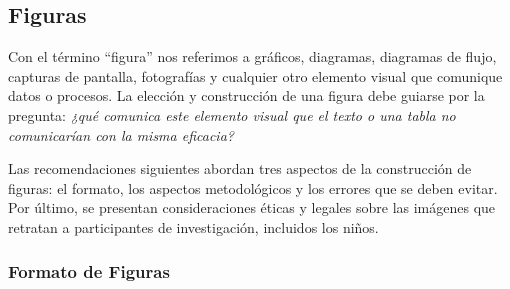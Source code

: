 \documentclass[spanish]{rbie2026}%
\begin{document}
\subsection{Figuras}

Con el término ``figura'' nos referimos a gráficos, diagramas, diagramas de flujo, capturas de pantalla, fotografías y cualquier otro elemento visual que comunique datos o procesos. La elección y construcción de una figura debe guiarse por la pregunta: \textit{¿qué comunica este elemento visual que el texto o una tabla no comunicarían con la misma eficacia?}

Las recomendaciones siguientes abordan tres aspectos de la construcción de figuras: el formato, los aspectos metodológicos y los errores que se deben evitar. Por último, se presentan consideraciones éticas y legales sobre las imágenes que retratan a participantes de investigación, incluidos los niños.

\subsubsection{Formato de Figuras}
\end{document}
